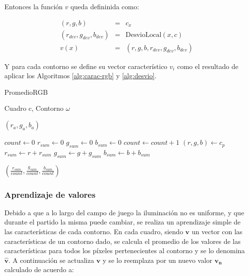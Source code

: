 Entonces la función $v$ queda defininida como:

\begin{eqnarray*}
    (r, g, b) &=&  c_{x} \\
    (r_{dev}, g_{dev}, b_{dev}) &=& \text{DesvioLocal}(x, c) \\
    v(x) &=& (r, g, b, r_{dev}, g_{dev}, b_{dev})
\end{eqnarray*}

Y para cada contorno se define su vector característico $v_i$ como el resultado de aplicar
los Algoritmos \ref{alg:carac-rgb} y \ref{alg:desvio}.

\begin{algorithm}
    \caption{PromedioRGB}
    \label{alg:carac-rgb}
    \begin{algorithmic}
    \Require\hspace{\algorithmicindent}\hspace{\algorithmicindent}Cuadro c, Contorno $\omega$

    \Ensure\hspace{\algorithmicindent}\hspace{0.23cm} $(r_a, g_a, b_a)$
    \State

    \State $count \gets 0$
    \State $r_{sum} \gets 0$
    \State $g_{sum} \gets 0$
    \State $b_{sum} \gets 0$
        \State $count \gets count + 1$
        \State $(r, g, b) \gets c_{p}$
        \State $r_{sum} \gets r + r_{sum}$
        \State $g_{sum} \gets g + g_{sum}$
        \State $b_{sum} \gets b + b_{sum}$
    \EndFor

    \State \Return $ (\frac{r_{sum}}{count}, \frac{g_{sum}}{count}, \frac{b_{sum}}{count}) $
    \end{algorithmic}
\end{algorithm}


\subsubsection{Aprendizaje de valores}

Debido a que a lo largo del campo de juego la iluminación no es uniforme, y que
durante el partido la misma puede cambiar, se realiza un aprendizaje simple
de las características de cada contorno. En cada cuadro, siendo $\mathbf{v}$ un
vector con las características de un contorno dado, se calcula el promedio de
los valores de las características para todos los píxeles pertenecientes al
contorno y se lo denomina $\hat{\mathbf{v}}$. A continuación se actualiza
$\mathbf{v}$ y se lo reemplaza por un nuevo valor $\mathbf{v_n}$ calculado de
acuerdo a:

